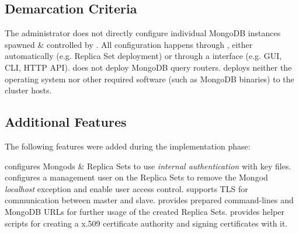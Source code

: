 \subsection{Demarcation Criteria}
\begin{description}
	 The administrator does not directly configure individual MongoDB instances spawned \& controlled by \mamid. 
	All configuration happens through \mamid, either automatically (e.g. Replica Set deployment) or through a \mamid interface (e.g. 
	GUI, CLI, HTTP API). 
		 \mamid does not deploy MongoDB query routers.  \done
	 \mamid deploys neither the operating system nor other required software (such as MongoDB binaries) to the 
	cluster hosts.  \done
\end{description}

\subsection{Additional Features}

The following features were added during the implementation phase:

\begin{description}
		 \mamid configures Mongods \& Replica Sets to use \textit{internal authentication} with key files. \done
		 \mamid configures a management user on the Replica Sets to remove the Mongod \textit{localhost} exception
			and enable user access control. \done
		 \mamid supports TLS for communication between master and slave. \done
		 \mamid provides prepared command-lines and MongoDB URLs for further usage of the created Replica Sets. \done
		 \mamid provides helper scripts for creating a x.509 certificate authority and signing certificates with it. \done
\end{description}

